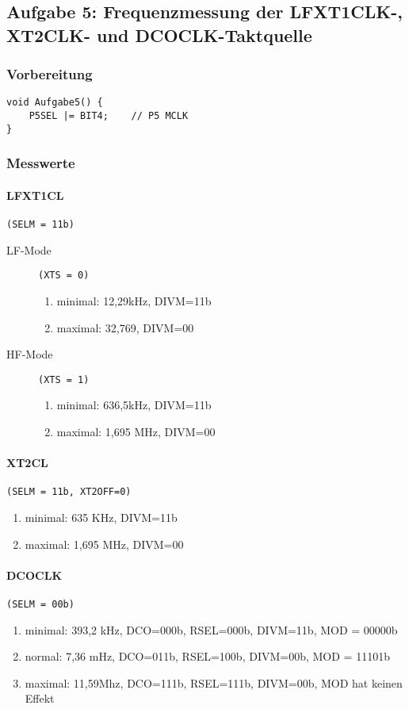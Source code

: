 \subsection*{Aufgabe 5: Frequenzmessung der LFXT1CLK-, XT2CLK- und DCOCLK-Taktquelle}

\subsubsection*{Vorbereitung}
\begin{lstlisting}
void Aufgabe5() {
    P5SEL |= BIT4;    // P5 MCLK 
}\end{lstlisting}

\subsubsection*{Messwerte}
\paragraph{LFXT1CL} \texttt{(SELM = 11b)}
\begin{description}
	\item [LF-Mode] \texttt{(XTS = 0)}
		\begin{enumerate}
			\item minimal: 12,29kHz, DIVM=11b
			\item maximal: 32,769, DIVM=00
		\end{enumerate}

	\item [HF-Mode] \texttt{(XTS = 1)}
		\begin{enumerate}
			\item minimal: 636,5kHz, DIVM=11b
			\item maximal: 1,695 MHz, DIVM=00
		\end{enumerate}
\end{description}

\paragraph{XT2CL} \texttt{(SELM = 11b, XT2OFF=0)}
\begin{enumerate}
	\item minimal: 635 KHz, DIVM=11b
	\item maximal: 1,695 MHz, DIVM=00
\end{enumerate}

\paragraph{DCOCLK} \texttt{(SELM = 00b)}
\begin{enumerate}
	\item minimal: 393,2 kHz, DCO=000b, RSEL=000b, DIVM=11b, MOD = 00000b
	\item normal: 7,36 mHz, DCO=011b, RSEL=100b, DIVM=00b, MOD = 11101b
	\item maximal: 11,59Mhz, DCO=111b, RSEL=111b, DIVM=00b, MOD hat keinen Effekt 
\end{enumerate}

